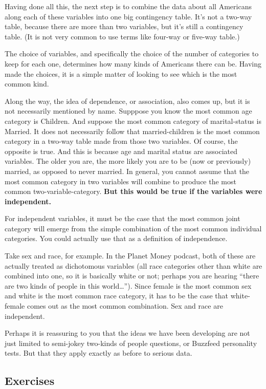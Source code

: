 \documentclass[openany]{book}
\begin{document}
Having done all this, the next step is to combine the data about all Americans along each of these variables into one big contingency table. It's not a two-way table, because there are more than two variables, but it's still a contingency table. (It is not very common to use terms like four-way or five-way table.)

The choice of variables, and specifically the choice of the number of categories to keep for each one, determines how many kinds of Americans there can be. Having made the choices, it is a simple matter of looking to see which is the most common kind.

Along the way, the idea of dependence, or association, also comes up, but it is not necessarily mentioned by name. Supppose you know the most common age category is Children. And suppose the most common category of marital-status is Married. It does not necessarily follow that married-children is the most common category in a two-way table made from those two variables. Of course, the opposite is true. And this is because age and marital status are associated variables. The older you are, the more likely you are to be (now or previously) married, as opposed to never married. In general, you cannot assume that the most common category in two variables will combine to produce the most common two-variable-category. \textbf{But this would be true if the variables were independent.}

For independent variables, it must be the case that the most common joint category will emerge from the simple combination of the most common individual categories. You could actually use that as a definition of independence.

Take sex and race, for example. In the Planet Money podcast, both of these are actually treated as dichotomous variables (all race categories other than white are combined into one, so it is basically white or not; perhaps you are hearing ``there are two kinds of people in this world\ldots{}''). Since female is the most common sex and white is the most common race category, it has to be the case that white-female comes out as the most common combination. Sex and race are independent.

Perhaps it is reassuring to you that the ideas we have been developing are not just limited to semi-jokey two-kinds of people questions, or Buzzfeed personality tests. But that they apply exactly as before to serious data.

\hypertarget{exercises}{%
\subsection*{Exercises}\label{exercises}}
\end{document}
